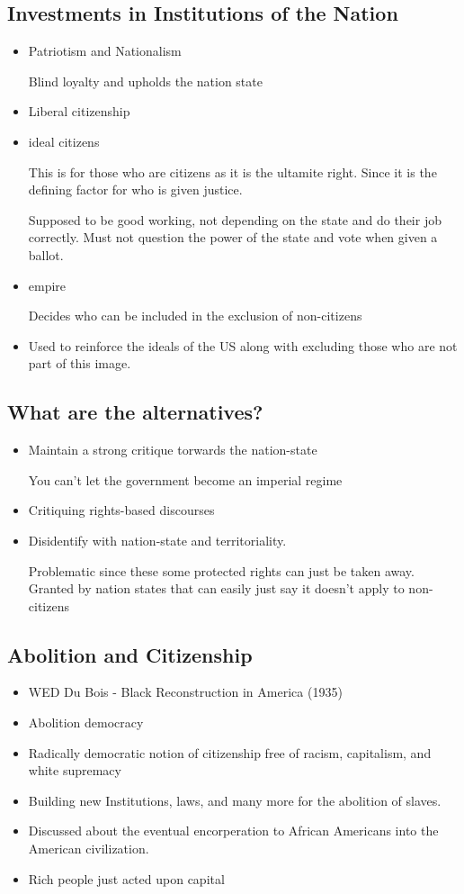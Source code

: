 \documentclass{article}
\begin{document}
\subsection{Investments in Institutions of the Nation}
\begin{itemize}
  \item Patriotism and Nationalism

    Blind loyalty and upholds the nation state
  \item Liberal citizenship
  \item ideal citizens

    This is for those who are citizens as it is the ultamite
    right. Since it is the defining factor for who is given justice.

    Supposed to be good working, not depending on the state and do their job correctly.
    Must not question the power of the state and vote when given a ballot.

  \item empire

    Decides who can be included in the exclusion of non-citizens

  \item Used to reinforce the ideals of the US along with
    excluding those who are not part of this image.
\end{itemize}

\subsection{What are the alternatives?}
\begin{itemize}
  \item Maintain a strong critique torwards the nation-state

    You can't let the government become an imperial regime
  \item Critiquing rights-based discourses
  \item Disidentify with nation-state and territoriality.

    Problematic since these some protected rights can just be taken away.
    Granted by nation states that can easily just say it doesn't apply
    to non-citizens
\end{itemize}

\subsection{Abolition and Citizenship}
\begin{itemize}
  \item WED Du Bois - Black Reconstruction in America (1935)
  \item Abolition democracy
  \item Radically democratic notion of citizenship free of racism,
    capitalism, and white supremacy
  \item Building new Institutions, laws, and many more for the
    abolition of slaves.
  \item Discussed about the eventual encorperation to African Americans
    into the American civilization.
  \item Rich people just acted upon capital
\end{itemize}
\end{document}
